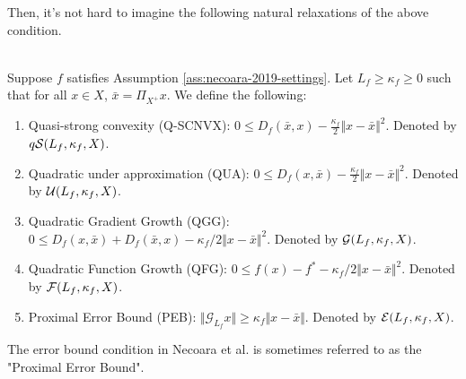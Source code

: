 \documentclass[12pt]{report}
\begin{document}
            Then, it's not hard to imagine the following natural relaxations of the above condition. 
            \begin{definition}\;\\
                Suppose $f$ satisfies Assumption \ref{ass:necoara-2019-settings}.
                \label{def:necoara-weaker-scnvx}
                Let $L_f \ge \kappa_f \ge 0$ such that for all $x \in X$, $\bar x = \Pi_{X^+} x$. 
                We define the following: 
                \begin{enumerate}
                    \item\label{def:neocara-qscnvx} Quasi-strong convexity (Q-SCNVX): $0 \le D_f(\bar x, x) - \frac{\kappa_f}{2}\Vert x - \bar x\Vert^2$. 
                    Denoted by $q\mathcal{S}(L_f, \kappa_f, X)$. 
                    \item\label{def:necoara-qup} Quadratic under approximation (QUA): $0 \le D_f(x, \bar x) - \frac{\kappa_f}{2}\Vert x - \bar x\Vert^2$. 
                    Denoted by $\mathcal U(L_f, \kappa_f, X)$. 
                    \item\label{def:necoara-qgg} Quadratic Gradient Growth (QGG): $0\le D_f(x, \bar x) + D_f(\bar x, x) - \kappa_f/2\Vert x - \bar x\Vert^2$. 
                    Denoted by $\mathcal G(L_f, \kappa_f, X)$. 
                    \item\label{def:necoara-qfg} Quadratic Function Growth (QFG): $0 \le f(x) - f^* - \kappa_f/2\Vert x - \bar x\Vert^2$. 
                    Denoted by $\mathcal F(L_f, \kappa_f, X)$. 
                    \item\label{def:necoara-peb} Proximal Error Bound (PEB): $\Vert \mathcal G_{L_f}x\Vert \ge \kappa_f\Vert x - \bar x\Vert$. 
                    Denoted by $\mathcal E (L_f, \kappa_f, X)$. 
                \end{enumerate}
            \end{definition}
            \begin{remark}
                The error bound condition in Necoara et al. is sometimes referred to as the "Proximal Error Bound". 
            \end{remark}
\end{document}
